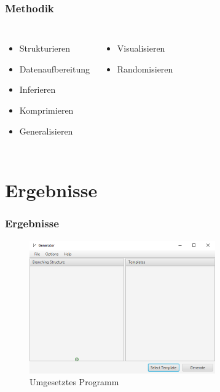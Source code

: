 \documentclass[12pt]{beamer}
\begin{document}
    \begin{frame}
        \frametitle{Methodik}

        \begin{columns}
            \begin{itemize}
                \setlength\itemsep{1em}
                \item<1-> Strukturieren
                \item<1-> Datenaufbereitung
                \item<1-> Inferieren
                \item<1-> Komprimieren
                \item<1-> Generalisieren
            \end{itemize}
            \begin{itemize}
                \setlength\itemsep{1em}
                \item<2-> Visualisieren
                \item<3-> Randomisieren
            \end{itemize}
        \end{columns}
    \end{frame}

    \section{Ergebnisse}
    \label{sec:ergebnisse}
    \begin{frame}
        \frametitle{Ergebnisse}

        \begin{figure}
            \centering
            \includegraphics[width=8cm,cfbox=blue 0.4pt 1pt]{../images/UI.PNG}
            \caption{Umgesetztes Programm}
        \end{figure}
    \end{frame}
\end{document}
